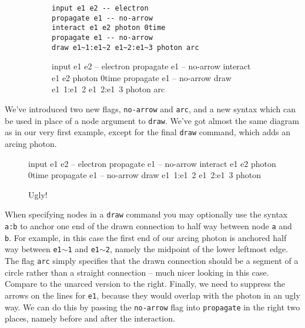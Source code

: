 \documentclass[12pt]{article}
\begin{document}
\begin{figure}[h!]\begin{subfigure}[h]{0.6\textwidth}\begin{center}
\begin{lstlisting}
input e1 e2 -- electron
propagate e1 -- no-arrow
interact e1 e2 photon 0time
propagate e1 -- no-arrow
draw e1~1:e1~2 e1~2:e1~3 photon arc
\end{lstlisting}
\end{center}\end{subfigure}\hfill\vrule\hfill\begin{subfigure}[h]{0.2\textwidth}\begin{center}
\begin{feynr}
input e1 e2 -- electron
propagate e1 -- no-arrow
interact e1 e2 photon 0time
propagate e1 -- no-arrow
draw e1~1:e1~2 e1~2:e1~3 photon arc
\end{feynr}
\end{center}\end{subfigure}\end{figure}
We've introduced two new flags, \texttt{no-arrow} and \texttt{arc}, and a new syntax which can be used in place of a node argument to \texttt{draw}.
We've got almost the same diagram as in our very first example, except for the final \texttt{draw} command, which adds an arcing photon.
\begin{wrapfigure}{r}{0.2\textwidth}
\begin{center}
\begin{feynr}
input e1 e2 -- electron
propagate e1 -- no-arrow
interact e1 e2 photon 0time
propagate e1 -- no-arrow
draw e1~1:e1~2 e1~2:e1~3 photon
\end{feynr}
\caption{Ugly!}
\end{center}
\end{wrapfigure}
When specifying nodes in a \texttt{draw} command you may optionally use the syntax \texttt{a:b} to anchor one end of the drawn connection to half way between node \texttt{a} and \texttt{b}.
For example, in this case the first end of our arcing photon is anchored half way between \texttt{e1$\sim$1} and \texttt{e1$\sim$2}, namely the midpoint of the lower leftmost edge.
The flag \texttt{arc} simply specifies that the drawn connection should be a segment of a circle rather than a straight connection -- much nicer looking in this case.
Compare to the unarced version to the right.
Finally, we need to suppress the arrows on the lines for \texttt{e1}, because they would overlap with the photon in an ugly way.
We can do this by passing the \texttt{no-arrow} flag into \texttt{propagate} in the right two places, namely before and after the interaction.
\end{document}
